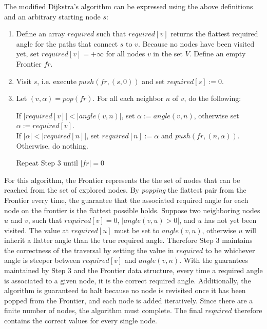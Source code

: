 \documentclass[12pt]{article}
\begin{document}
\par The modified Dijkstra's algorithm can be expressed using the above definitions and an arbitrary starting node $s$:
\begin{enumerate}[Step 1]
  \item Define an array $required$ such that $required[v]$ returns the flattest required angle for the paths that connect $s$ to $v$. Because no nodes have been visited yet, set $required[v] = +\infty$ for all nodes $v$ in the set $V$. Define an empty Frontier $fr$.
  \item Visit $s$, i.e. execute $push(fr, (s, 0))$ and set $required[s] := 0$.
  \item Let $(v,\alpha) = pop(fr)$. For all each neighbor $n$ of $v$, do the following:
  \begin{displayquote}
    If $|required[v]| < |angle(v,n)|$, set $\alpha := angle(v,n)$, otherwise set $\alpha := required[v]$.\\
    If $ |\alpha| < |required[n]|$, set $required[n] := \alpha$ and $push(fr, (n, \alpha))$. Otherwise, do nothing.
  \end{displayquote}
  Repeat Step 3 until $|fr| = 0$
\end{enumerate}
\par For this algorithm, the Frontier represents the the set of nodes that can be reached from the set of explored nodes. By \emph{popping} the flattest pair from the Frontier every time, the guarantee that the associated required angle for each node on the frontier is the flattest possible holds. Suppose two neighboring nodes $u$ and $v$, such that $required[v] = 0$, $|angle(v,u) > 0|$, and $u$ has not yet been visited. The value at $required[u]$ must be set to $angle(v,u)$, otherwise $u$ will inherit a flatter angle than the true required angle. Therefore Step 3 maintains the correctness of the traversal by setting the value in $required$ to be whichever angle is steeper between $required[v]$ and $angle(v,n)$. With the guarantees maintained by Step 3 and the Frontier data structure, every time a required angle is associated to a given node, it is the correct required angle. Additionally, the algorithm is guaranteed to halt because no node is revisited once it has been popped from the Frontier, and each node is added iteratively. Since there are a finite number of nodes, the algorithm must complete. The final $required$ therefore contains the correct values for every single node.
\end{document}
